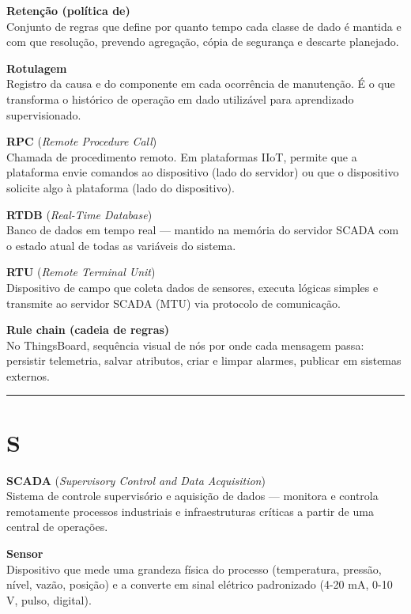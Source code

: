 \textbf{Retenção (política de)}\\
Conjunto de regras que define por quanto tempo cada classe de dado é mantida e com que resolução, prevendo agregação, cópia de segurança e descarte planejado.

\textbf{Rotulagem}\\
Registro da causa e do componente em cada ocorrência de manutenção. É o que transforma o histórico de operação em dado utilizável para aprendizado supervisionado.

\textbf{RPC} (\emph{Remote Procedure Call})\\
Chamada de procedimento remoto. Em plataformas IIoT, permite que a plataforma envie comandos ao dispositivo (lado do servidor) ou que o dispositivo solicite algo à plataforma (lado do dispositivo).

\textbf{RTDB} (\emph{Real-Time Database})\\
Banco de dados em tempo real --- mantido na memória do servidor SCADA com o estado atual de todas as variáveis do sistema.

\textbf{RTU} (\emph{Remote Terminal Unit})\\
Dispositivo de campo que coleta dados de sensores, executa lógicas simples e transmite ao servidor SCADA (MTU) via protocolo de comunicação.

\textbf{Rule chain (cadeia de regras)}\\
No ThingsBoard, sequência visual de nós por onde cada mensagem passa: persistir telemetria, salvar atributos, criar e limpar alarmes, publicar em sistemas externos.

\begin{center}\rule{0.5\linewidth}{0.5pt}\end{center}

\section{S}\label{s}

\textbf{SCADA} (\emph{Supervisory Control and Data Acquisition})\\
Sistema de controle supervisório e aquisição de dados --- monitora e controla remotamente processos industriais e infraestruturas críticas a partir de uma central de operações.

\textbf{Sensor}\\
Dispositivo que mede uma grandeza física do processo (temperatura, pressão, nível, vazão, posição) e a converte em sinal elétrico padronizado (4-20 mA, 0-10 V, pulso, digital).

